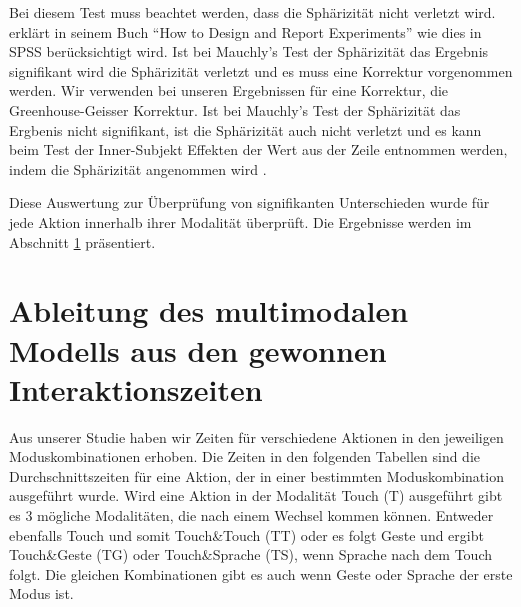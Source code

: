 Bei diesem Test muss beachtet werden, dass die Sphärizität nicht verletzt wird. 
\citet{field2002design} erklärt in seinem Buch "`How to Design and Report Experiments"' wie dies in SPSS berücksichtigt wird. 
Ist bei Mauchly's Test der Sphärizität das Ergebnis signifikant wird die Sphärizität verletzt und es muss eine Korrektur vorgenommen werden. 
Wir verwenden bei unseren Ergebnissen für eine Korrektur, die Greenhouse-Geisser Korrektur. 
Ist bei Mauchly's Test der Sphärizität das Ergbenis nicht signifikant, ist die Sphärizität auch nicht verletzt und es kann beim Test der Inner-Subjekt Effekten der Wert aus der Zeile entnommen werden, indem die Sphärizität angenommen wird \citep{field2002design}.

Diese Auswertung zur Überprüfung von signifikanten Unterschieden wurde für jede Aktion innerhalb ihrer Modalität überprüft. Die Ergebnisse werden im Abschnitt \ref{sec:Herleitung} präsentiert.

\section[Herleitung des Modells]{Ableitung des multimodalen Modells aus den gewonnen Interaktionszeiten}\label{sec:Herleitung}
Aus unserer Studie haben wir Zeiten für verschiedene Aktionen in den jeweiligen Moduskombinationen erhoben. Die Zeiten in den folgenden Tabellen sind die Durchschnittszeiten für eine Aktion, der in einer bestimmten Moduskombination ausgeführt wurde. Wird eine Aktion in der Modalität Touch (T) ausgeführt gibt es 3 mögliche Modalitäten, die nach einem Wechsel kommen können. Entweder ebenfalls Touch und somit Touch\&Touch (TT) oder es folgt Geste und ergibt Touch\&Geste (TG) oder Touch\&Sprache (TS), wenn Sprache nach dem Touch folgt. Die gleichen Kombinationen gibt es auch wenn Geste oder Sprache der erste Modus ist. 

